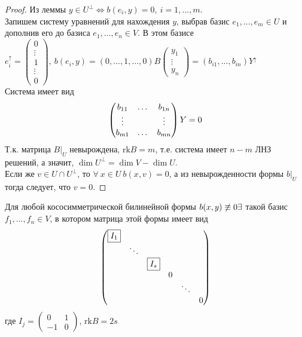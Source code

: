 \begin{proof}
    Из леммы  $y \in U^\perp \Longleftrightarrow b(e_i, y) = 0, \ i = 1,...,m$.\\
    Запишем систему уравнений для нахождения $y$, выбрав базис $e_1,...,e_m \in U$ и дополнив его до базиса $e_1,...,e_n \in V$. В этом базисе $e_i^{\uparrow} = \begin{pmatrix} 0 \\ \vdots \\ 1 \\ \vdots \\ 0 \end{pmatrix}, \ b(e_i, y) = (0,...,1,...,0)B \begin{pmatrix} y_1 \\ \vdots \\ y_n \end{pmatrix} = (b_{i1},...,b_{in})Y^{\uparrow}$\\
    Система имеет вид 
    $$\begin{pmatrix}
        b_{11}&\dots&b_{1n}\\
        \vdots&\null&\vdots\\
        b_{m1}&\dots&b_{mn}
    \end{pmatrix} Y = 0$$
    Т.к. матрица $B|_U$ невырождена, $\text{rk} B = m$, т.е. система имеет $n-m$ ЛНЗ решений, а значит, $\dim U^\perp = \dim V - \dim U$.\\
    Если же $v \in U\cap U^\perp$, то $\forall \ x\in U \ b(x,v) = 0$, а из невырожденности формы $b|_U$ тогда следует, что $v = 0$. 
\end{proof}
\begin{theorem}
    Для любой кососимметрической билинейной формы $b(x,y) \not \equiv 0 \\ \exists$ такой базис $f_1,...,f_n \in V$, в котором матрица этой формы имеет вид
    $$\begin{pmatrix}
    \text{\fbox{$I_1$}}\\
    \null & \ddots\\
    \null & \null & \text{\fbox{$I_s$}}\\
    \null & \null & \null & 0\\
    \null & \null & \null & \null & \ddots\\
    \null & \null & \null & \null & \null & 0
    \end{pmatrix}$$ 
    где $I_j = \begin{pmatrix} 0&1 \\ -1&0 \end{pmatrix}$, $\text{rk} B = 2s$
\end{theorem}
